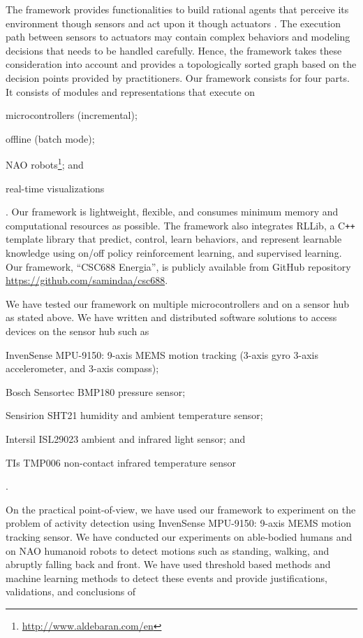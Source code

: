 \documentclass[letterpaper]{article}
\begin{document}
The framework provides functionalities to build  rational agents that perceive its
environment though sensors and act upon it though actuators \cite{russel2009}. The execution path
between sensors to actuators may contain complex behaviors and modeling decisions that needs to be
handled carefully. Hence, the framework takes these consideration into account and provides a
topologically sorted graph based on the decision points provided by practitioners. Our
framework consists for four parts. It consists of modules and representations that execute on
\begin{inparaenum}[(1)]\item microcontrollers (incremental); \item offline (batch mode); \item NAO
robots\footnote{\url{http://www.aldebaran.com/en}}; and \item real-time
visualizations\end{inparaenum}. Our framework is lightweight, flexible, and consumes minimum memory
and computational resources as
possible. The framework also integrates RLLib, a C\texttt{++} template library that predict,
control, learn behaviors, and represent learnable knowledge using on/off policy reinforcement
learning, and supervised learning. Our framework, ``CSC688 Energia'', is publicly available from
GitHub repository \url{https://github.com/samindaa/csc688}.

We have tested our framework on multiple microcontrollers and on a sensor hub as stated above. We
have written and distributed software solutions to access devices on the sensor hub such as
\begin{inparaenum}[(1)] \item InvenSense MPU-9150: 9-axis MEMS motion tracking (3-axis gyro
3-axis accelerometer, and 3-axis compass); \item Bosch Sensortec BMP180 pressure sensor; \item
Sensirion SHT21 humidity and ambient temperature sensor; \item Intersil ISL29023 ambient and
infrared light sensor; and \item TIs TMP006 non-contact infrared temperature sensor\end{inparaenum}.

On the practical point-of-view, we have used our framework to experiment on the problem of activity
detection using InvenSense MPU-9150: 9-axis MEMS motion tracking sensor. We have conducted our
experiments on able-bodied humans and on NAO humanoid robots to detect motions such as standing,
walking, and abruptly falling back and front. We have used threshold based methods and machine
learning methods to detect these events and provide justifications, validations, and conclusions of
\end{document}
